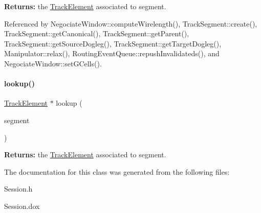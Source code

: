 {\bfseries Returns\+:} the \mbox{\hyperlink{classKite_1_1TrackElement}{Track\+Element}} associated to {\ttfamily segment}. 

Referenced by Negociate\+Window\+::compute\+Wirelength(), Track\+Segment\+::create(), Track\+Segment\+::get\+Canonical(), Track\+Segment\+::get\+Parent(), Track\+Segment\+::get\+Source\+Dogleg(), Track\+Segment\+::get\+Target\+Dogleg(), Manipulator\+::relax(), Routing\+Event\+Queue\+::repush\+Invalidateds(), and Negociate\+Window\+::set\+G\+Cells().

\mbox{\label{classKite_1_1Session_a3946039ef19b5b6994171288f183bdaf}} 
\paragraph{\texorpdfstring{lookup()}{lookup()}\hspace{0.1cm}{\footnotesize\ttfamily [2/2]}}
{\footnotesize\ttfamily \mbox{\hyperlink{classKite_1_1TrackElement}{Track\+Element}} $\ast$ lookup (\begin{DoxyParamCaption}\item[{\textbf{ Auto\+Segment} $\ast$}]{segment }\end{DoxyParamCaption})\hspace{0.3cm}{\ttfamily [static]}}

{\bfseries Returns\+:} the \mbox{\hyperlink{classKite_1_1TrackElement}{Track\+Element}} associated to {\ttfamily segment}. 

The documentation for this class was generated from the following files\+:\begin{DoxyCompactItemize}
\item 
Session.\+h\item 
Session.\+dox\end{DoxyCompactItemize}
